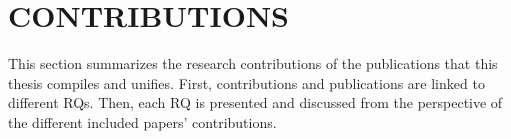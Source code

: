 \section{CONTRIBUTIONS} \normalfont



This section summarizes the research contributions of the publications that this thesis compiles and unifies. First, contributions and publications are linked to different RQs. Then, each RQ is presented and discussed from the perspective of the different included papers' contributions.



